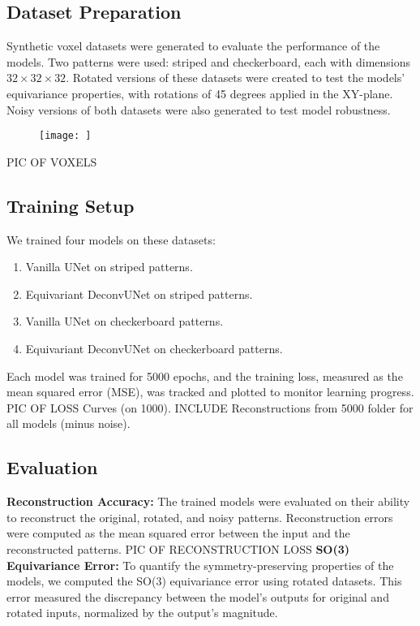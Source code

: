 \documentclass[letterpaper]{article}
\begin{document}
\subsection{Dataset Preparation}
Synthetic voxel datasets were generated to evaluate the performance of the models. Two patterns were used: striped and checkerboard, each with dimensions $32 \times 32 \times 32$. Rotated versions of these datasets were created to test the models' equivariance properties, with rotations of 45 degrees applied in the XY-plane. Noisy versions of both datasets were also generated to test model robustness.
\begin{figure}[H]
    \texttt{[image: ]}
\end{figure}
\newline PIC OF VOXELS
\subsection{Training Setup}
We trained four models on these datasets:
\begin{enumerate}
    \item Vanilla UNet on striped patterns.
    \item Equivariant DeconvUNet on striped patterns.
    \item Vanilla UNet on checkerboard patterns.
    \item Equivariant DeconvUNet on checkerboard patterns.
\end{enumerate}
Each model was trained for 5000 epochs, and the training loss, measured as the mean squared error (MSE), was tracked and plotted to monitor learning progress.
\newline PIC OF LOSS Curves (on 1000). INCLUDE Reconstructions from 5000 folder for all models (minus noise). 

\subsection{Evaluation}
\textbf{Reconstruction Accuracy:} 
The trained models were evaluated on their ability to reconstruct the original, rotated, and noisy patterns. Reconstruction errors were computed as the mean squared error between the input and the reconstructed patterns.
\newline PIC OF RECONSTRUCTION LOSS
\textbf{SO(3) Equivariance Error:} 
To quantify the symmetry-preserving properties of the models, we computed the SO(3) equivariance error using rotated datasets. This error measured the discrepancy between the model's outputs for original and rotated inputs, normalized by the output's magnitude.
\end{document}

